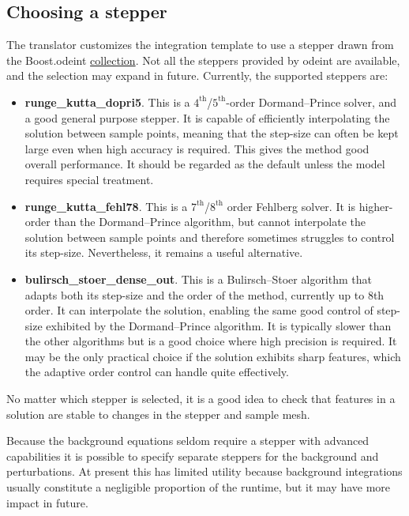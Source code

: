 \documentclass[11pt,a4paper]{article}
\newcommand{\packagefont}{\sffamily}
\newcommand{\Boost}{{\packagefont Boost}}
\newcommand{\odeint}{{\packagefont odeint}}
\newcommand{\option}[1]{{\ttfamily\bfseries\small #1}}
\begin{document}
\subsection{Choosing a stepper}
\label{sec:stepper-block}
The translator customizes the integration
template to use
a stepper drawn from
the {\Boost}.{\odeint}
\href{http://www.boost.org/doc/libs/1_60_0/libs/numeric/odeint/doc/html/boost_numeric_odeint/getting_started/overview.html}{collection}.
Not all the steppers provided by {\odeint} are available,
and the selection may expand in future.
Currently, the supported steppers are:
\begin{itemize}
	\item \option{runge\_kutta\_dopri5}.
	This is a $4^{\mathrm{th}}$/$5^{\mathrm{th}}$-order
	Dormand--Prince solver, and a good general purpose stepper.
	It is capable of efficiently interpolating the solution between
	sample points, meaning that the step-size can often be kept large
	even when high accuracy is required.
	This gives the method good overall performance.
	It should be regarded as the default unless the model requires
	special treatment.
	
	\item \option{runge\_kutta\_fehl78}.
	This is a $7^{\mathrm{th}}$/$8^{\mathrm{th}}$ order
	Fehlberg solver.
	It is higher-order than the Dormand--Prince algorithm,
	but cannot interpolate the solution between sample points
	and
	therefore
	sometimes struggles to control its step-size.
	Nevertheless,
	it remains a useful alternative.
	
	\item \option{bulirsch\_stoer\_dense\_out}.
	This is a Bulirsch--Stoer algorithm that adapts both its
	step-size and the order of the method, currently up to 8th order.
	It can interpolate the solution, enabling the same good control
	of step-size exhibited by the Dormand--Prince algorithm.
	It is typically slower than the other algorithms
	but
	is a good choice where high precision is required.
	It may be the only practical choice if the solution exhibits
	sharp features, which the adaptive order control can handle
	quite effectively.
\end{itemize}
No matter which stepper is selected, it is a good idea to check
that features in a solution
are stable to changes in the stepper and sample mesh.

Because the background equations seldom require a stepper with advanced
capabilities it is possible to specify separate steppers
for the background and perturbations.
At present this has limited utility because background integrations
usually constitute a negligible proportion of the runtime,
but it may have more impact in future.
\end{document}
